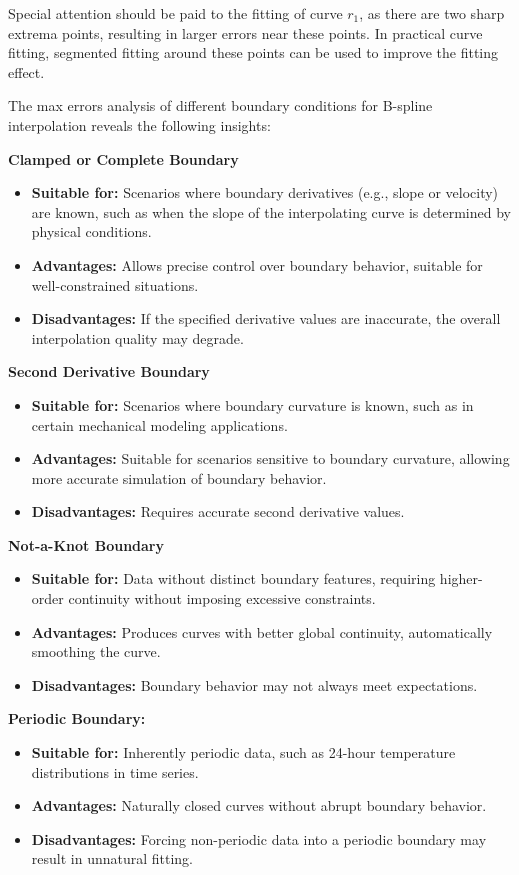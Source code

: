 \documentclass[a4paper]{article}
\begin{document}
\begin{sloppypar}
Special attention should be paid to the fitting of curve \(r_1\), as there are
two sharp extrema points, resulting in larger errors near these points. In
practical curve fitting, segmented fitting around these points can be used to
improve the fitting effect.

The max errors analysis of different boundary conditions for B-spline
interpolation reveals the following insights:

\textbf{Clamped or Complete Boundary}
\begin{itemize}
  \item \textbf{Suitable for:} Scenarios where boundary derivatives (e.g., slope or velocity) are known, such as when the slope of the interpolating curve is determined by physical conditions.
  \item \textbf{Advantages:} Allows precise control over boundary behavior, suitable for well-constrained situations.
  \item \textbf{Disadvantages:} If the specified derivative values are inaccurate, the overall interpolation quality may degrade.
\end{itemize}

\textbf{Second Derivative Boundary}
\begin{itemize}
  \item \textbf{Suitable for:} Scenarios where boundary curvature is known, such as in certain mechanical modeling applications.
  \item \textbf{Advantages:} Suitable for scenarios sensitive to boundary curvature, allowing more accurate simulation of boundary behavior.
  \item \textbf{Disadvantages:} Requires accurate second derivative values.
\end{itemize}

\textbf{Not-a-Knot Boundary}
\begin{itemize}
  \item \textbf{Suitable for:} Data without distinct boundary features, requiring higher-order continuity without imposing excessive constraints.
  \item \textbf{Advantages:} Produces curves with better global continuity, automatically smoothing the curve.
  \item \textbf{Disadvantages:} Boundary behavior may not always meet expectations.
\end{itemize}

\textbf{Periodic Boundary:}
\begin{itemize}
  \item \textbf{Suitable for:} Inherently periodic data, such as 24-hour temperature distributions in time series.
  \item \textbf{Advantages:} Naturally closed curves without abrupt boundary behavior.
  \item \textbf{Disadvantages:} Forcing non-periodic data into a periodic boundary may result in unnatural fitting.
\end{itemize}


\end{sloppypar}
\end{document}
